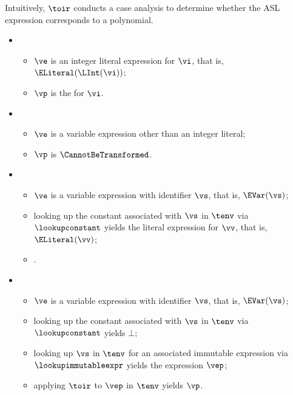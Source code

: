 \ProseParagraph
Intuitively, $\toir$ conducts a case analysis to determine whether the ASL expression corresponds to a polynomial.

\OneApplies
\begin{itemize}
  \item {}
  \begin{itemize}
    \item $\ve$ is an integer literal expression for $\vi$, that is, $\ELiteral(\LInt(\vi))$;
    \item $\vp$ is the \symbolicexpressionterm{} for $\vi$.
  \end{itemize}

  \item {}
  \begin{itemize}
    \item $\ve$ is a variable expression other than an integer literal;
    \item $\vp$ is $\CannotBeTransformed$.
  \end{itemize}

  \item {}
  \begin{itemize}
    \item $\ve$ is a variable expression with identifier $\vs$, that is, $\EVar(\vs)$;
    \item looking up the constant associated with $\vs$ in $\tenv$ via $\lookupconstant$ yields the literal expression for $\vv$, that is, $\ELiteral(\vv)$;
    \item {}.
  \end{itemize}

  \item {}
  \begin{itemize}
    \item $\ve$ is a variable expression with identifier $\vs$, that is, $\EVar(\vs)$;
    \item looking up the constant associated with $\vs$ in $\tenv$ via $\lookupconstant$ yields $\bot$;
    \item looking up $\vs$ in $\tenv$ for an associated immutable expression via \\
          $\lookupimmutableexpr$ yields the expression $\vep$;
    \item applying $\toir$ to $\vep$ in $\tenv$ yields $\vp$.
  \end{itemize}


\end{itemize}
